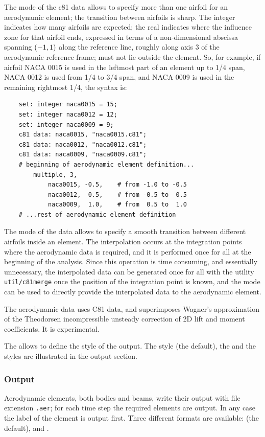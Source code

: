 The  mode of the c81 data allows to specify
more than one airfoil for an aerodynamic element; the transition
between airfoils is sharp.
The integer  indicates how many airfoils are expected;
the real  indicates where the influence zone for that
airfoil ends, expressed in terms of a non-dimensional abscissa spanning 
$\left( -1,1 \right)$ along the reference line, roughly along axis 3 
of the aerodynamic reference frame;  must not lie outside
the element.
So, for example, if airfoil NACA 0015 is used in the leftmost part
of an element up to 1/4 span, NACA 0012 is used from 1/4 to 3/4 span,
and NACA 0009 is used in the remaining rightmost 1/4, the syntax is:
\begin{verbatim}
    set: integer naca0015 = 15;
    set: integer naca0012 = 12;
    set: integer naca0009 = 9;
    c81 data: naca0015, "naca0015.c81";
    c81 data: naca0012, "naca0012.c81";
    c81 data: naca0009, "naca0009.c81";
    # beginning of aerodynamic element definition...
        multiple, 3,
            naca0015, -0.5,    # from -1.0 to -0.5
            naca0012,  0.5,    # from -0.5 to  0.5
            naca0009,  1.0,    # from  0.5 to  1.0
    # ...rest of aerodynamic element definition
\end{verbatim}

The  mode of the  data allows to specify 
a smooth transition between different airfoils inside an element.
The interpolation occurs at the integration points where the
aerodynamic data is required, and it is performed once for all
at the beginning of the analysis.
Since this operation is time consuming, and essentially unnecessary,
the interpolated data can be generated once for all with the utility
\texttt{util/c81merge} once the position of the integration point is known,
and the  mode can be used to directly provide
the interpolated data to the aerodynamic element.

The  aerodynamic data uses C81 data,
and superimposes Wagner's approximation of the Theodorsen incompressible
unsteady correction of 2D lift and moment coefficients.
It is experimental.

The  allows to define the style of the output.
The  style (the default), the  and the 
styles are illustrated in the output section.


\subsubsection{Output}
Aerodynamic elements, both bodies and beams, write their output with file
extension \texttt{.aer}; for each time step the required elements are output.
In any case the label of the element is output first.
Three different formats are available:  (the default),
 and .

